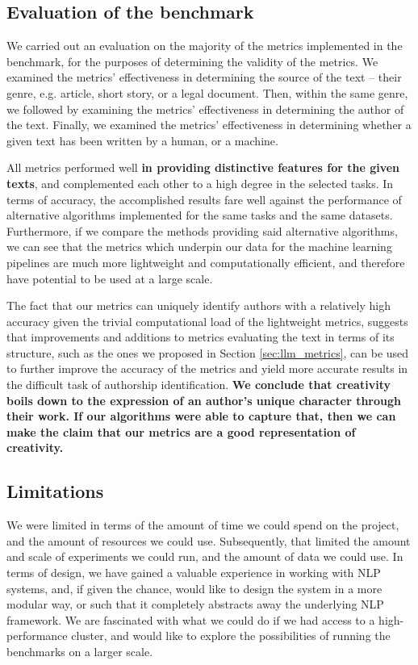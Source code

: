 \subsection{Evaluation of the benchmark}

We carried out an evaluation on the majority of the metrics implemented in the benchmark, for the purposes of determining the validity of the metrics. We examined the metrics' effectiveness in determining the source of the text -- their genre, e.g. article, short story, or a legal document. Then, within the same genre, we followed by examining the metrics' effectiveness in determining the author of the text. Finally, we examined the metrics' effectiveness in determining whether a given text has been written by a human, or a machine.

All metrics performed well \textbf{in providing distinctive features for the given texts}, and complemented each other to a high degree in the selected tasks. In terms of accuracy, the accomplished results fare well against the performance of alternative algorithms implemented for the same tasks and the same datasets. Furthermore, if we compare the methods providing said alternative algorithms, we can see that the metrics which underpin our data for the machine learning pipelines are much more lightweight and computationally efficient, and therefore have potential to be used at a large scale.

The fact that our metrics can uniquely identify authors with a relatively high accuracy given the trivial computational load of the lightweight metrics, suggests that improvements and additions to metrics evaluating the text in terms of its structure,  such as the ones we proposed in Section \ref{sec:llm_metrics}, can be used to further improve the accuracy of the metrics and yield more accurate results in the difficult task of authorship identification. \textbf{We conclude that creativity boils down to the expression of an author's unique character through their work. If our algorithms were able to capture that, then we can make the claim that our metrics are a good representation of creativity.}




\subsection{Limitations}
We were limited in terms of the amount of time we could spend on the project, and the amount of resources we could use. Subsequently, that limited the amount and scale of experiments we could run, and the amount of data we could use. In terms of design, we have gained a valuable experience in working with NLP systems, and, if given the chance, would like to design the system in a more modular way, or such that it completely abstracts away the underlying NLP framework. We are fascinated with what we could do if we had access to a high-performance cluster, and would like to explore the possibilities of running the benchmarks on a larger scale. 

